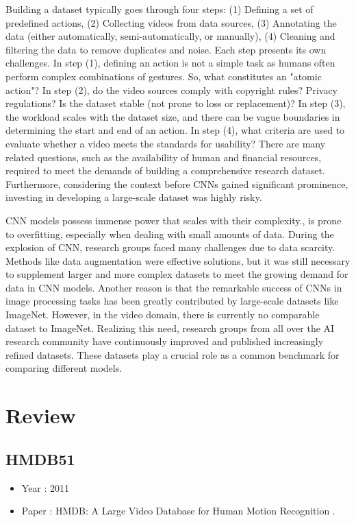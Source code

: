 \documentclass[10pt,onecolumn,letterpaper]{article}
\begin{document}
Building a dataset typically goes through four steps: (1) Defining a set of
predefined actions, (2) Collecting videos from data sources, (3) Annotating the
data (either automatically, semi-automatically, or manually), (4) Cleaning and
filtering the data to remove duplicates and noise. Each step presents its own
challenges. In step (1), defining an action is not a simple task as humans often
perform complex combinations of gestures. So, what constitutes an "atomic
action"? In step (2), do the video sources comply with copyright rules? Privacy
regulations? Is the dataset stable (not prone to loss or replacement)? In step
(3), the workload scales with the dataset size, and there can be vague
boundaries in determining the start and end of an action. In step (4), what
criteria are used to evaluate whether a video meets the standards for usability?
There are many related questions, such as the availability of human and
financial resources, required to meet the demands of building a comprehensive
research dataset. Furthermore, considering the context before CNNs gained
significant prominence, investing in developing a large-scale dataset was highly
risky.

CNN models possess immense power that scales with their complexity., is prone to
overfitting, especially when dealing with small amounts of data. During the
explosion of CNN, research groups faced many challenges due to data scarcity.
Methods like data augmentation were effective solutions, but it was still
necessary to supplement larger and more complex datasets to meet the growing
demand for data in CNN models. Another reason is that the remarkable success of
CNNs in image processing tasks has been greatly contributed by large-scale
datasets like ImageNet. However, in the video domain, there is currently no
comparable dataset to ImageNet. Realizing this need, research groups from all
over the AI research community have continuously improved and published
increasingly refined datasets. These datasets play a crucial role as a common
benchmark for comparing different models.

\section{Review}

\subsection{HMDB51}

\begin{itemize}
	\item Year : 2011
	\item Paper : HMDB: A Large Video Database for Human Motion Recognition
	\cite{HMDB51}.
\end{itemize}
\end{document}
